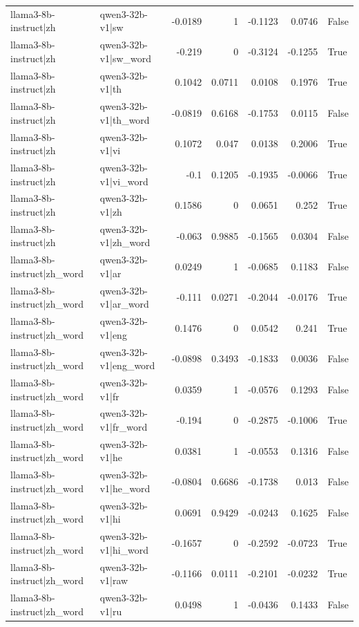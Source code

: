 \begin{table}
\begin{tabular}{l l r r r r l}
llama3-8b-instruct|zh & qwen3-32b-v1|sw & -0.0189 & 1 & -0.1123 & 0.0746 & False \\
llama3-8b-instruct|zh & qwen3-32b-v1|sw_word & -0.219 & 0 & -0.3124 & -0.1255 & True \\
llama3-8b-instruct|zh & qwen3-32b-v1|th & 0.1042 & 0.0711 & 0.0108 & 0.1976 & True \\
llama3-8b-instruct|zh & qwen3-32b-v1|th_word & -0.0819 & 0.6168 & -0.1753 & 0.0115 & False \\
llama3-8b-instruct|zh & qwen3-32b-v1|vi & 0.1072 & 0.047 & 0.0138 & 0.2006 & True \\
llama3-8b-instruct|zh & qwen3-32b-v1|vi_word & -0.1 & 0.1205 & -0.1935 & -0.0066 & True \\
llama3-8b-instruct|zh & qwen3-32b-v1|zh & 0.1586 & 0 & 0.0651 & 0.252 & True \\
llama3-8b-instruct|zh & qwen3-32b-v1|zh_word & -0.063 & 0.9885 & -0.1565 & 0.0304 & False \\
llama3-8b-instruct|zh_word & qwen3-32b-v1|ar & 0.0249 & 1 & -0.0685 & 0.1183 & False \\
llama3-8b-instruct|zh_word & qwen3-32b-v1|ar_word & -0.111 & 0.0271 & -0.2044 & -0.0176 & True \\
llama3-8b-instruct|zh_word & qwen3-32b-v1|eng & 0.1476 & 0 & 0.0542 & 0.241 & True \\
llama3-8b-instruct|zh_word & qwen3-32b-v1|eng_word & -0.0898 & 0.3493 & -0.1833 & 0.0036 & False \\
llama3-8b-instruct|zh_word & qwen3-32b-v1|fr & 0.0359 & 1 & -0.0576 & 0.1293 & False \\
llama3-8b-instruct|zh_word & qwen3-32b-v1|fr_word & -0.194 & 0 & -0.2875 & -0.1006 & True \\
llama3-8b-instruct|zh_word & qwen3-32b-v1|he & 0.0381 & 1 & -0.0553 & 0.1316 & False \\
llama3-8b-instruct|zh_word & qwen3-32b-v1|he_word & -0.0804 & 0.6686 & -0.1738 & 0.013 & False \\
llama3-8b-instruct|zh_word & qwen3-32b-v1|hi & 0.0691 & 0.9429 & -0.0243 & 0.1625 & False \\
llama3-8b-instruct|zh_word & qwen3-32b-v1|hi_word & -0.1657 & 0 & -0.2592 & -0.0723 & True \\
llama3-8b-instruct|zh_word & qwen3-32b-v1|raw & -0.1166 & 0.0111 & -0.2101 & -0.0232 & True \\
llama3-8b-instruct|zh_word & qwen3-32b-v1|ru & 0.0498 & 1 & -0.0436 & 0.1433 & False \\

\end{tabular}
\end{table}
